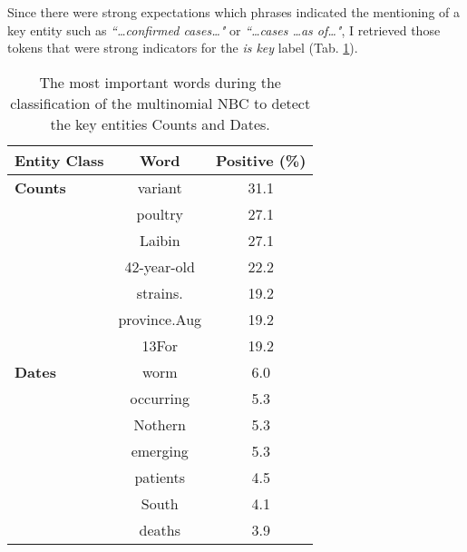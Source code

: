   Since there were strong expectations which phrases indicated the mentioning of a key entity such as \textit{``\dots confirmed cases\dots"} or \textit{``\dots cases \dots as of\dots"}, I retrieved those tokens that were strong indicators for the \textsl{is key} label (Tab. \ref{table:important_words}).

  \begin{table}[h!]
    \centering
    \caption{The most important words during the classification of the multinomial NBC to detect the key entities Counts and Dates.}
    \begin{tabular}{@{}lcc@{}}
      \toprule
      \textbf{Entity Class}& \textbf{Word} & \textbf{Positive (\%)}\\
      \midrule
      \textbf{Counts}& variant& 31.1\\
      & poultry& 27.1\\
      & Laibin& 27.1\\
      & 42-year-old& 22.2\\
      & strains.& 19.2\\
      & province.Aug& 19.2\\
      & 13For& 19.2\vspace{2mm}\\
      \textbf{Dates}
      & worm& 6.0\\
      & occurring& 5.3\\
      & Nothern& 5.3\\
      & emerging& 5.3\\
      & patients& 4.5\\
      & South& 4.1\\
      & deaths& 3.9\\
      \bottomrule
    \end{tabular}
  \label{table:important_words}
  \end{table}

